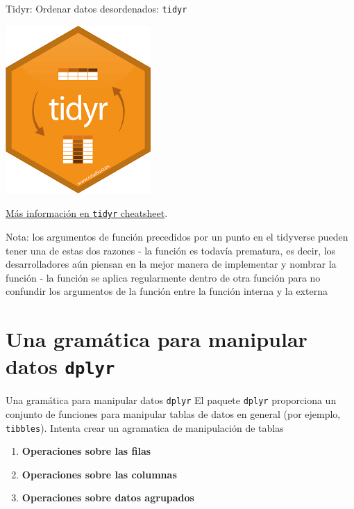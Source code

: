 \documentclass[
  ignorenonframetext,
  aspectratio=169]{beamer}
\providecommand{\tightlist}{%
  \setlength{\itemsep}{0pt}\setlength{\parskip}{0pt}}
\begin{document}
\begin{frame}[fragile]{Tidyr: Ordenar datos desordenados:
\texttt{tidyr}}
\label{tidyr-ordenar-datos-desordenados-tidyr-18}
\begin{flushright}\includegraphics[width=0.05\linewidth]{Imgs/logo_tidyr} \end{flushright}

\href{https://raw.githubusercontent.com/rstudio/cheatsheets/master/data-import.pdf}{Más
información en \texttt{tidyr} cheatsheet}.

Nota: los argumentos de función precedidos por un punto en el tidyverse
pueden tener una de estas dos razones - la función es todavía prematura,
es decir, los desarrolladores aún piensan en la mejor manera de
implementar y nombrar la función - la función se aplica regularmente
dentro de otra función para no confundir los argumentos de la función
entre la función interna y la externa
\end{frame}

\section{\texorpdfstring{Una gramática para manipular datos
\texttt{dplyr}}{Una gramática para manipular datos dplyr}}\label{una-gramuxe1tica-para-manipular-datos-dplyr}

\begin{frame}[fragile]{Una gramática para manipular datos
\texttt{dplyr}}
\label{una-gramuxe1tica-para-manipular-datos-dplyr-1}
El paquete \texttt{dplyr} proporciona un conjunto de funciones para
manipular tablas de datos en general (por ejemplo, \texttt{tibbles}).
Intenta crear un agramatica de manipulación de tablas

\begin{enumerate}
\tightlist
\item
  \textbf{Operaciones sobre las filas}
\item
  \textbf{Operaciones sobre las columnas}
\item
  \textbf{Operaciones sobre datos agrupados}
\end{enumerate}
\end{frame}
\end{document}
